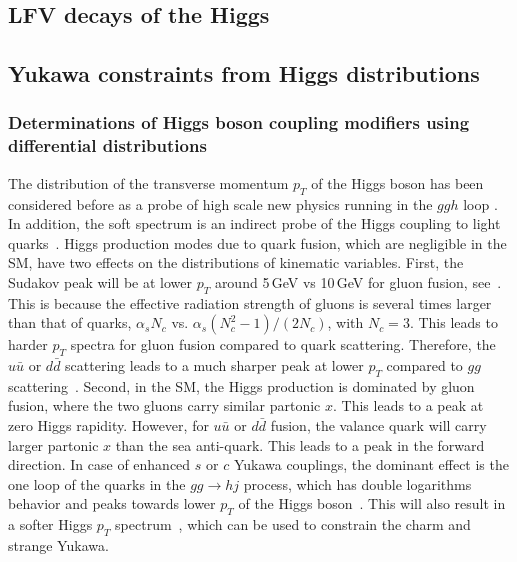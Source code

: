 \documentclass[../report.tex]{subfiles}
\begin{document}
\subsection{LFV decays of the Higgs}


\subsection{Yukawa constraints from Higgs distributions}
\label{sec:HiggsDist}

\subsubsection{Determinations of Higgs boson coupling modifiers using differential distributions}


The distribution of the transverse momentum $p_T$ of the Higgs boson has been considered before as a probe of high scale new physics running in the $ggh$ loop \cite{Arnesen:2008fb,Biekotter:2016ecg,Brehmer:2015rna,Dawson:2015gka,Schlaffer:2014osa,Grojean:2013nya,Langenegger:2015lra,Bramante:2014hua,Buschmann:2014twa,Azatov:2013xha,Banfi:2013yoa,Buschmann:2014sia}. 
In addition, the soft spectrum is an indirect probe of the Higgs coupling to light quarks~\cite{Soreq:2016rae,Bishara:2016jga}. 
Higgs production modes due to quark fusion, which are negligible in the SM, have two effects on the distributions of kinematic variables. 
%
First, the Sudakov peak will be at lower $p_T$ around 5\,GeV vs 10\,GeV for gluon fusion, see~\cite{Collins:1984kg}. This is because the effective radiation strength of gluons is several times larger than that of quarks, $\alpha_s N_c$ vs. $\alpha_s (N^2_c-1)/(2N_c)$, with $N_c=3$. This leads to harder $p_T$ spectra for gluon fusion compared to quark scattering. 
Therefore, the $u\bar{u}$ or $d\bar{d}$ scattering leads to a much sharper peak at lower $p_T$ compared to  $gg$ scattering~\cite{Soreq:2016rae}.
Second, in the SM, the Higgs production is dominated by  gluon fusion, where the two gluons carry similar partonic $x$. This leads to a peak at zero Higgs rapidity. However, for $u\bar u$ or $d\bar d$ fusion, the valance quark will carry larger partonic $x$ than the sea anti-quark. This leads to a peak in the forward direction. 
%
In case of enhanced $s$ or $c$ Yukawa couplings, the dominant effect is the one loop of the quarks in the $gg\to hj$ process, which has double logarithms behavior and peaks towards lower $p_T$ of the Higgs boson~\cite{Baur:1989cm}. This will also result in a softer Higgs $p_T$ spectrum~\cite{Bishara:2016jga}, which can be used to constrain the charm and strange Yukawa. 
\end{document}
